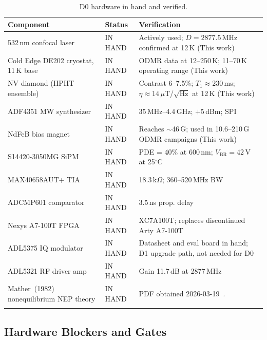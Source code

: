 \begin{longtable}{@{}p{4cm}p{2.5cm}p{6cm}@{}}
\toprule
\textbf{Component} & \textbf{Status} & \textbf{Verification} \\
\midrule
\endhead
532\,nm confocal laser & IN HAND &
  Actively used; $D = 2877.5$\,MHz confirmed at 12\,K (This work) \\
Cold Edge DE202 cryostat, 11\,K base & IN HAND &
  ODMR data at 12--250\,K; 11--70\,K operating range (This work) \\
NV diamond (HPHT ensemble) & IN HAND &
  Contrast 6--7.5\%; $T_1 \approx 230$\,ms; $\eta \approx 14\,\mu$T/$\sqrt{\text{Hz}}$
  at 12\,K (This work) \\
ADF4351 MW synthesizer & IN HAND &
  35\,MHz--4.4\,GHz; $+5$\,dBm; SPI~\cite{ADF4351datasheet}
  \\
NdFeB bias magnet & IN HAND &
  Reaches $\sim$46\,G; used in 10.6--210\,G ODMR campaigns (This work) \\
S14420-3050MG SiPM & IN HAND &
  PDE = 40\% at 600\,nm; $V_\mathrm{BR} = 42$\,V at 25$^\circ$C~\cite{S14420datasheet}
  \\
MAX40658AUT+ TIA & IN HAND & 18.3\,k$\Omega$; 360--520\,MHz BW~\cite{MAX40658datasheet}
  \\
ADCMP601 comparator & IN HAND & 3.5\,ns prop. delay~\cite{ADCMP601datasheet}
  \\
Nexys A7-100T FPGA & IN HAND &
  XC7A100T; replaces discontinued Arty A7-100T~\cite{NexysA7refmanual}
  \\
ADL5375 IQ modulator & IN HAND &
  Datasheet and eval board in hand; D1 upgrade path, not needed for D0~\cite{ADL5375datasheet} \\
ADL5321 RF driver amp & IN HAND &
  Gain 11.7\,dB at 2877\,MHz~\cite{ADL5321datasheet}
  \\
Mather~(1982) nonequilibrium NEP theory & IN HAND &
  PDF obtained 2026-03-19~\cite{Mather1982}.
  \\
\midrule
\caption{D0 hardware in hand and verified.}
\label{tab:hw_in_hand}
\endlastfoot
\bottomrule
\end{longtable}

\subsection{Hardware Blockers and Gates}

